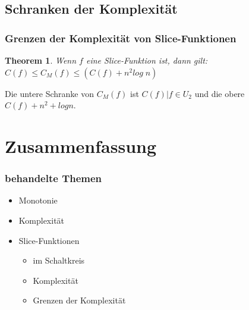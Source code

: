 \documentclass[hyperref={pdfpagelabels=false}]{beamer} %
\newtheorem{thm}{Theorem}
\begin{document}
  \subsection*{Schranken der Komplexität}
  \begin{frame}%
    \frametitle{Grenzen der Komplexität von Slice-Funktionen}
    \begin{thm}
      Wenn $f$ eine Slice-Funktion ist, dann gilt:
      $C(f) \leq C_M(f) \leq (C(f) +n^2 log\;n)$%
    \end{thm}
    Die untere Schranke von $C_M(f)$ ist $C(f)|f \in U_2$ und die obere $C(f) + n^2 + log n$.
  \end{frame}

  \section{Zusammenfassung}
  \begin{frame}
    \frametitle{behandelte Themen}
    \begin{itemize}
      \item Monotonie
      \item Komplexität
      \item Slice-Funktionen
      \begin{itemize}
        \item im Schaltkreis
        \item Komplexität
        \item Grenzen der Komplexität
      \end{itemize}
    \end{itemize}
  \end{frame}
\end{document}
